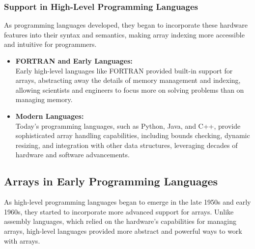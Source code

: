 \documentclass{book}
\begin{document}
	\subsubsection{Support in High-Level Programming Languages}
				
			As programming languages developed, they began to incorporate these hardware features into their syntax and semantics, making array indexing more accessible and intuitive for programmers.
		\begin{itemize}
			\item \textbf{FORTRAN and Early Languages:}\\
			Early high-level languages like FORTRAN provided built-in support for arrays, abstracting away the details of memory management and indexing, allowing scientists and engineers to focus more on solving problems than on managing memory.
			\item \textbf{Modern Languages:}\\
			Today’s programming languages, such as Python, Java, and C++, provide sophisticated array handling capabilities, including bounds checking, dynamic resizing, and integration with other data structures, leveraging decades of hardware and software advancements.
		\end{itemize}
	\subsection{Arrays in Early Programming Languages}
	
	As high-level programming languages began to emerge in the late 1950s and early 1960s, they started to incorporate more advanced support for arrays. Unlike assembly languages, which relied on the hardware's capabilities for managing arrays, high-level languages provided more abstract and powerful ways to work with arrays.
	
\end{document}
